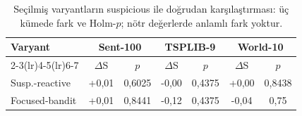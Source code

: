 \begin{table}[!htbp]
 \centering\small
 \caption{Seçilmiş varyantların suspicious ile doğrudan karşılaştırması: üç kümede fark ve Holm-$p$; nötr değerlerde anlamlı fark yoktur.}
 \label{tab:focused-suspicious}
\begin{tabular*}{\textwidth}{@{\extracolsep{\fill}}lcccccc}
\toprule
Varyant & \multicolumn{2}{c}{Sent-100}  & \multicolumn{2}{c}{TSPLIB-9}  & \multicolumn{2}{c}{World-10} \\
\cmidrule(lr){2-3}\cmidrule(lr){4-5}\cmidrule(lr){6-7}
 & $\Delta$S & $p$ & $\Delta$S & $p$ & $\Delta$S & $p$ \\
\midrule
Susp.-reactive & +0,01 & 0,6025 & -0,00 & 0,4375 & +0,00 & 0,8438 \\
Focused-bandit & +0,01 & 0,8441 & -0,12 & 0,4375 & -0,04 & 0,75 \\
\bottomrule
\end{tabular*}
\end{table}
